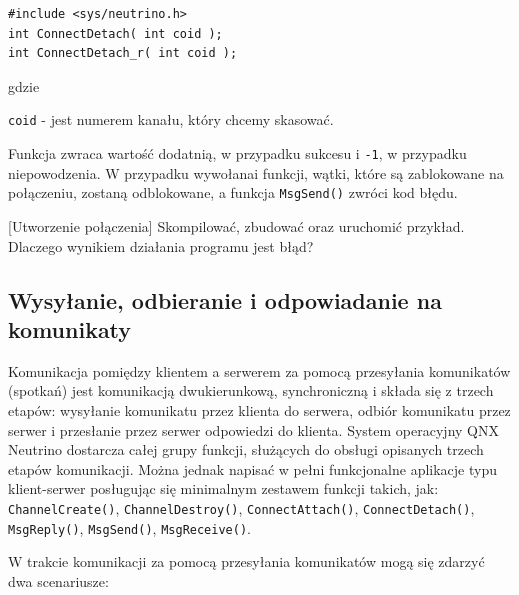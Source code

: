 \begin{lstlisting}[style=MyCStyle]
#include <sys/neutrino.h>
int ConnectDetach( int coid );
int ConnectDetach_r( int coid );
\end{lstlisting}

gdzie 

\begin{myitemize}
\item[] \lstinline[style=MyCStyle]{coid} - jest numerem kanału, który chcemy skasować. 
\end{myitemize} 

Funkcja zwraca wartość dodatnią, w przypadku sukcesu i \lstinline[style=MyCStyle]{-1}, w przypadku niepowodzenia. W przypadku wywołanai funkcji, wątki, które są zablokowane na połączeniu, zostaną odblokowane, a funkcja \lstinline[style=MyCStyle]{MsgSend()} zwróci kod błędu. 

\begin{example}{[Utworzenie połączenia]} Skompilować, zbudować oraz uruchomić przykład. Dlaczego wynikiem działania programu jest błąd?

\end{example} 

\subsection{Wysyłanie, odbieranie i odpowiadanie na komunikaty}

Komunikacja pomiędzy klientem a serwerem za pomocą przesyłania komunikatów (spotkań) jest komunikacją dwukierunkową, synchroniczną i składa się z trzech etapów: wysyłanie komunikatu przez klienta do serwera, odbiór komunikatu przez serwer i przesłanie przez serwer odpowiedzi do klienta. System operacyjny QNX Neutrino dostarcza całej grupy funkcji, służących do obsługi opisanych trzech etapów komunikacji. Można jednak napisać w pełni funkcjonalne aplikacje typu klient-serwer posługując się minimalnym zestawem funkcji takich, jak: \lstinline[style=MyCStyle]{ChannelCreate()}, \lstinline[style=MyCStyle]{ChannelDestroy()}, \lstinline[style=MyCStyle]{ConnectAttach()}, \lstinline[style=MyCStyle]{ConnectDetach()}, \lstinline[style=MyCStyle]{MsgReply()}, \lstinline[style=MyCStyle]{MsgSend()}, \lstinline[style=MyCStyle]{MsgReceive()}. 

W trakcie komunikacji za pomocą przesyłania komunikatów mogą się zdarzyć dwa scenariusze: 

